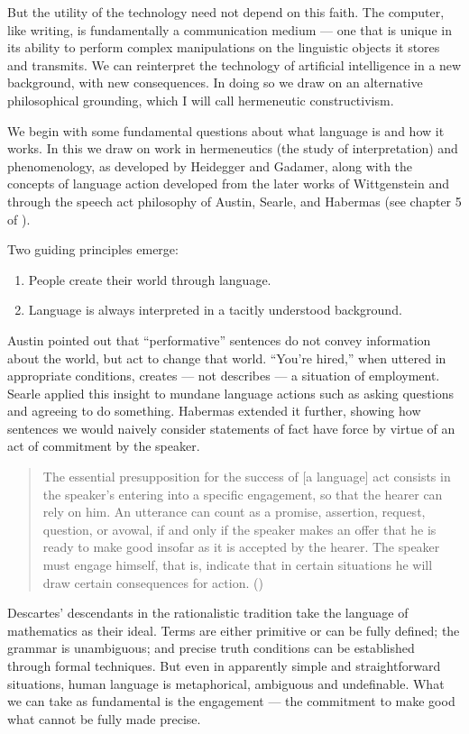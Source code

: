 \documentclass[12pt]{article}
\def\bq{\begin{quote}}
\def\eq{\end{quote}}
\begin{document}
But the utility of the technology need not depend on this faith. The computer, like writing, is fundamentally a communication medium --- one that is unique in its ability to perform complex manipulations on the linguistic objects it stores and transmits. We can reinterpret the technology of artificial intelligence in a new background, with new consequences. In doing so we draw on an alternative philosophical grounding, which I will call hermeneutic constructivism.

We begin with some fundamental questions about what language is and how it works. In this we draw on work in hermeneutics (the study of interpretation) and phenomenology, as developed by Heidegger and Gadamer, along with the concepts of language action developed from the later works of Wittgenstein and through the speech act philosophy of Austin, Searle, and Habermas (see chapter 5 of \cite{winograd-flores-1986}).

Two guiding principles emerge:

\begin{enumerate}
\item People create their world through language.
\item Language is always interpreted in a tacitly understood background.
\end{enumerate}

Austin pointed out that ``performative'' sentences do not convey information about the world, but act to change that world. ``You're hired,'' when uttered in appropriate conditions, creates --- not describes --- a situation of employment. Searle applied this insight to mundane language actions such as asking questions and agreeing to do something. Habermas extended it further, showing how sentences we would naively consider statements of fact have force by virtue of an act of commitment by the speaker.

\bq
The essential presupposition for the success of [a language] act consists in the speaker's entering into a specific engagement, so that the hearer can rely on him. An utterance can count as a promise, assertion, request, question, or avowal, if and only if the speaker makes an offer that he is ready to make good insofar as it is accepted by the hearer. The speaker must engage himself, that is, indicate that in certain situations he will draw certain consequences for action. ({\it \cite{jurgen1979}})
\eq

Descartes' descendants in the rationalistic tradition take the language of mathematics as their ideal. Terms are either primitive or can be fully defined; the grammar is unambiguous; and precise truth conditions can be established through formal techniques. But even in apparently simple and straightforward situations, human language is metaphorical, ambiguous and undefinable. What we can take as fundamental is the engagement --- the commitment to make good what cannot be fully made precise.
\end{document}
